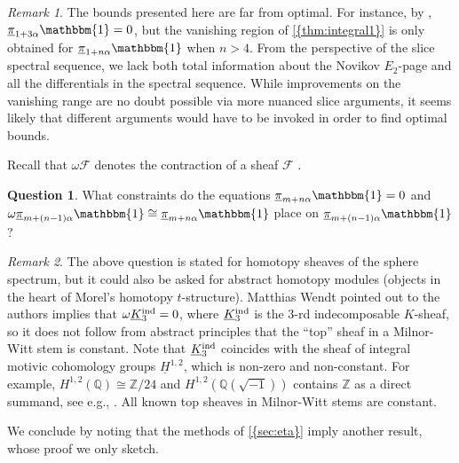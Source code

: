 \documentclass[10pt]{amsart}
\numberwithin{equation}{section}
\theoremstyle{plain}
\theoremstyle{definition}
\newtheorem{question}[question]{Question}
\theoremstyle{remark}
\newtheorem{remark}[remark]{Remark}
\begin{document}
\begin{remark}
The bounds presented here are far from optimal.  For instance, by \cite{RSO:pi1}, ${\underline{\smash{\pi}}}_{1+3\alpha}{\mathbbm{1}} = 0$, but the vanishing region of {\autoref{{thm:integral1}}} is only obtained for ${\underline{\smash{\pi}}}_{1+n\alpha}{\mathbbm{1}}$ when $n>4$.  From the perspective of the slice spectral sequence, we lack both total information about the Novikov $E_2$-page and all the differentials in the spectral sequence.  While improvements on the vanishing range are no doubt possible via more nuanced slice arguments, it seems likely that different arguments would have to be invoked in order to find optimal bounds.
\end{remark}

Recall that $\omega{\mathscr{F}}$ denotes the contraction of a sheaf ${\mathscr{F}}$ \cite{morel:A1}.
\begin{question}
What constraints do the equations ${\underline{\smash{\pi}}}_{m+n\alpha}{\mathbbm{1}} = 0$ and $\omega{\underline{\smash{\pi}}}_{m+(n-1)\alpha}{\mathbbm{1}} \cong {\underline{\smash{\pi}}}_{m+n\alpha}{\mathbbm{1}}$ place on ${\underline{\smash{\pi}}}_{m+(n-1)\alpha}{\mathbbm{1}}$?
\end{question}

\begin{remark}
The above question is stated for homotopy sheaves of the sphere spectrum, but it could also be asked for abstract homotopy modules (objects in the heart of Morel's homotopy $t$-structure).  Matthias Wendt pointed out to the authors \cite[Lemma 3.7]{asokfasel} implies that $\omega{\underline{\smash{K}}}_3^{\mathrm{ind}} = 0$, where ${\underline{\smash{K}}}_3^{\mathrm{ind}}$ is the $3$-rd indecomposable $K$-sheaf, so it does not follow from abstract principles that the ``top'' sheaf in a Milnor-Witt stem is constant. Note that ${\underline{\smash{K}}}_3^{\mathrm{ind}}$ coincides with the sheaf of integral motivic cohomology groups $\underline{H}^{1,2}$, which is non-zero and non-constant. For example, $H^{1,2}(\mathbb{Q}){\cong}{\mathbb{Z}}/24$ and $H^{1,2}(\mathbb{Q}(\sqrt{-1}))$ contains ${\mathbb{Z}}$ as a direct summand, see e.g., \cite[p.~542, 564]{merkurjev-suslin.k3}. All known top sheaves in Milnor-Witt stems are constant.
\end{remark}

We conclude by noting that the methods of {\autoref{{sec:eta}}} imply another result, whose proof we only sketch.
\end{document}
